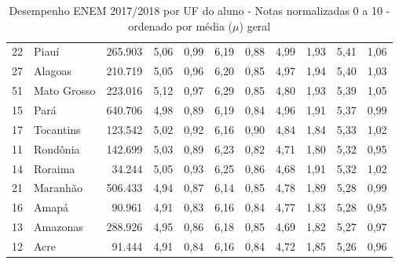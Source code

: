 \begin{table}[]
{\begin{tabular}{llrrrrrrrrr}
            22 & Piauí               & 265.903   & 5,06 & 0,99 & 6,19 & 0,88 & 4,99 & 1,93 & 5,41 & 1,06 \\
            \rowcolor[HTML]{DCE6F1}
            27 & Alagoas             & 210.719   & 5,05 & 0,96 & 6,20 & 0,85 & 4,97 & 1,94 & 5,40 & 1,03 \\
            51 & Mato Grosso         & 223.016   & 5,12 & 0,97 & 6,29 & 0,85 & 4,80 & 1,93 & 5,39 & 1,05 \\
            \rowcolor[HTML]{DCE6F1}
            15 & Pará                & 640.706   & 4,98 & 0,89 & 6,19 & 0,84 & 4,96 & 1,91 & 5,37 & 0,99 \\
            17 & Tocantins           & 123.542   & 5,02 & 0,92 & 6,16 & 0,90 & 4,84 & 1,84 & 5,33 & 1,02 \\
            \rowcolor[HTML]{DCE6F1}
            11 & Rondônia            & 142.699   & 5,03 & 0,89 & 6,23 & 0,82 & 4,71 & 1,80 & 5,32 & 0,95 \\
            14 & Roraima             & 34.244    & 5,05 & 0,93 & 6,25 & 0,86 & 4,68 & 1,91 & 5,32 & 1,02 \\
            \rowcolor[HTML]{DCE6F1}
            21 & Maranhão            & 506.433   & 4,94 & 0,87 & 6,14 & 0,85 & 4,78 & 1,89 & 5,28 & 0,99 \\
            16 & Amapá               & 90.961    & 4,91 & 0,83 & 6,16 & 0,84 & 4,77 & 1,83 & 5,28 & 0,95 \\
            \rowcolor[HTML]{DCE6F1}
            13 & Amazonas            & 288.926   & 4,95 & 0,86 & 6,18 & 0,85 & 4,69 & 1,82 & 5,27 & 0,97 \\
            12 & Acre                & 91.444    & 4,91 & 0,84 & 6,16 & 0,84 & 4,72 & 1,85 & 5,26 & 0,96
        \end{tabular}
    }
    \caption{ Desempenho ENEM 2017/2018 por UF do aluno - Notas normalizadas 0 a 10 - ordenado por média ($\mu$) geral}
    \label{table:ENEM}
\end{table}
